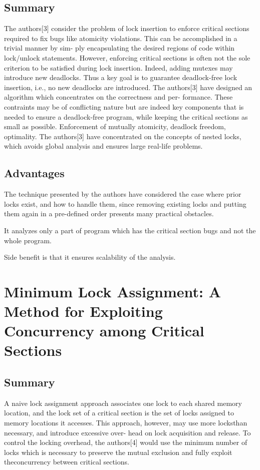 \subsection{Summary}

The authors[3] consider the problem of lock insertion to enforce critical sections required to fix bugs like atomicity violations. This can be accomplished in a trivial manner by sim- ply encapsulating the desired regions of code within lock/unlock statements. However, enforcing critical sections is often not the sole criterion to be satisfied during lock insertion. Indeed, adding mutexes may introduce new deadlocks. Thus a key goal is to guarantee deadlock-free lock insertion, i.e., no new deadlocks are introduced.
The authors[3] have designed an algorithm which concentrates on the correctness and per- formance. These contraints may be of conflicting nature but are indeed key components that is needed to ensure a deadlock-free program, while keeping the critical sections as small as possible. Enforcement of mutually atomicity, deadlock freedom, optimality. The authors[3] have concentrated on the concepts of nested locks, which avoids global analysis and ensures large real-life problems.

\subsection{Advantages}

The technique presented by the authors have considered the case where prior locks exist, and how to handle them, since removing existing locks and putting them again in a pre-defined order presents many practical obstacles.

It analyzes only a part of program which has the critical section bugs and not the whole program.

Side benefit is that it ensures scalability of the analysis.

\section{Minimum Lock Assignment: A Method for Exploiting Concurrency among Critical Sections}

\subsection{Summary}

A naive lock assignment approach associates one lock to each shared memory location, and the lock set of a critical section is the set of locks assigned to memory locations it accesses. This approach, however, may use more locksthan necessary, and introduce excessive over- head on lock acquisition and release. To control the locking overhead, the authors[4] would use the minimum number of locks which is necessary to preserve the mutual exclusion and fully exploit theconcurrency between critical sections.

